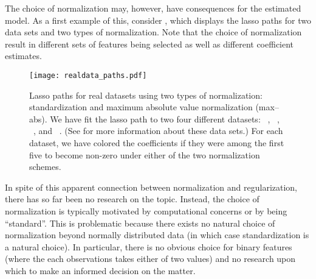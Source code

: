 The choice of normalization may, however, have consequences for the estimated model. As a
first example of this, consider , which displays the lasso paths
for two data sets and two types of normalization. Note that the choice of normalization
result in different sets of features being selected as well as different coefficient
estimates.

\begin{figure}[bpt]
  \centering
  \texttt{[image: realdata\_paths.pdf]}
  \caption{%
    Lasso paths for real datasets using two types of normalization:
    standardization and maximum absolute value normalization (max--abs). We have fit
    the lasso path to two four different datasets:
    ~\citep{harrison1978}, ~\citep{golub1999},
    ~\citep{king1995,hirst1994}, and ~\citep{platt1998}. (See 
    for more information about these data sets.) For each
    dataset, we have colored the coefficients if they were among the first five
    to become non-zero under either of the two normalization schemes.   }
  \label{fig:realdata-paths}
\end{figure}

In spite of this apparent connection between normalization and regularization, there has so
far been no research on the topic. Instead, the choice of normalization is typically
motivated by computational concerns or by being ``standard''. This is problematic because
there exists no natural choice of normalization beyond normally distributed data (in which
case standardization is a natural choice). In particular, there is no obvious choice for
binary features (where the each observations takes either of two values) and no research
upon which to make an informed decision on the matter.


